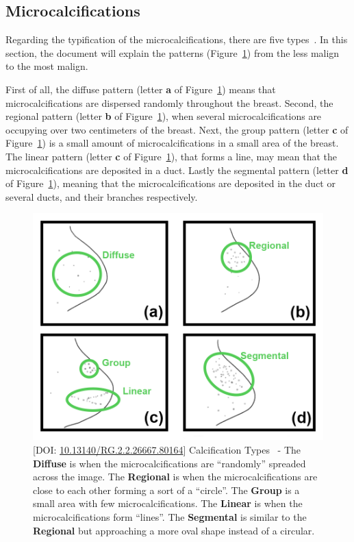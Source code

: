\subsection{Microcalcifications}
\label{sec:sec002004002}

Regarding the typification of the microcalcifications, there are five types~\cite{nadia2020xai}.
In this section, the document will explain the patterns (Figure~\ref{fig:fig022}) from the less malign to the most malign.

First of all, the diffuse pattern (letter {\bf a} of Figure~\ref{fig:fig022}) means that microcalcifications are dispersed randomly throughout the breast.
Second, the regional pattern (letter {\bf b} of Figure~\ref{fig:fig022}), when several microcalcifications are occupying over two centimeters of the breast.
Next, the group pattern (letter {\bf c} of Figure~\ref{fig:fig022}) is a small amount of microcalcifications in a small area of the breast.
The linear pattern (letter {\bf c} of Figure~\ref{fig:fig022}), that forms a line, may mean that the microcalcifications are deposited in a duct.
Lastly the segmental pattern (letter {\bf d} of Figure~\ref{fig:fig022}), meaning that the microcalcifications are deposited in the duct or several ducts, and their branches respectively.

\begin{figure}[htbp]
\centering
\includegraphics[width=\columnwidth]{images/fig022}
\caption{[DOI: \href{https://doi.org/10.13140/RG.2.2.26667.80164}{10.13140/RG.2.2.26667.80164}] Calcification Types~\cite{nadia2020maivect} - The {\bf Diffuse} is when the microcalcifications are ``randomly'' spreaded across the image. The {\bf Regional} is when the microcalcifications are close to each other forming a sort of a ``circle''. The {\bf Group} is a small area with few microcalcifications. The {\bf Linear} is when the microcalcifications form ``lines''. The {\bf Segmental} is similar to the {\bf Regional} but approaching a more oval shape instead of a circular.}
\label{fig:fig022}
\end{figure}


